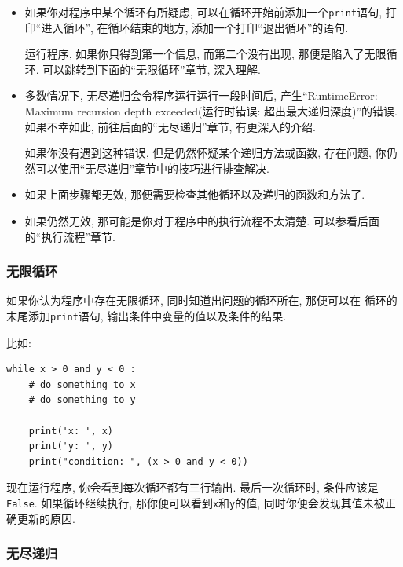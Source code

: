 \documentclass[10pt]{book}
\begin{document}
\begin{itemize}

\item 如果你对程序中某个循环有所疑虑, 可以在循环开始前添加一个{\tt print}语句, 
打印``进入循环'', 在循环结束的地方, 添加一个打印``退出循环''的语句. 

运行程序, 如果你只得到第一个信息, 而第二个没有出现, 
那便是陷入了无限循环. 可以跳转到下面的``无限循环''章节, 深入理解. 

\item 多数情况下, 无尽递归会令程序运行运行一段时间后, 产生``RuntimeError: Maximum
recursion depth exceeded(运行时错误: 超出最大递归深度)''的错误. 
如果不幸如此, 前往后面的``无尽递归''章节, 有更深入的介绍. 

如果你没有遇到这种错误, 但是仍然怀疑某个递归方法或函数, 存在问题, 
你仍然可以使用``无尽递归''章节中的技巧进行排查解决. 

\item 如果上面步骤都无效, 那便需要检查其他循环以及递归的函数和方法了. 

\item 如果仍然无效, 那可能是你对于程序中的执行流程不太清楚. 
可以参看后面的``执行流程''章节. 
\end{itemize}


\subsubsection{无限循环}

如果你认为程序中存在无限循环, 同时知道出问题的循环所在, 那便可以在
循环的末尾添加{\tt print}语句, 输出条件中变量的值以及条件的结果. 

比如:

\begin{verbatim}
while x > 0 and y < 0 :
    # do something to x
    # do something to y

    print('x: ', x)
    print('y: ', y)
    print("condition: ", (x > 0 and y < 0))
\end{verbatim}
%
现在运行程序, 你会看到每次循环都有三行输出. 
最后一次循环时, 条件应该是{\tt False}.
如果循环继续执行, 那你便可以看到{\tt x}和{\tt y}的值, 
同时你便会发现其值未被正确更新的原因.


\subsubsection{无尽递归}
\end{document}
